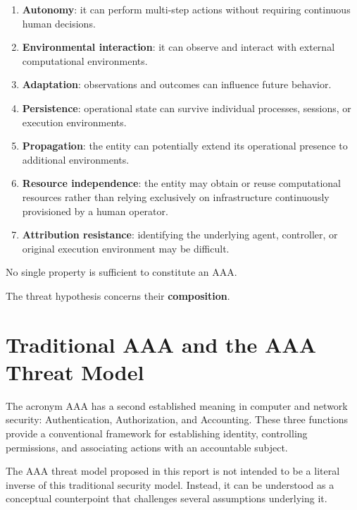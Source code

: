\documentclass[11pt,a4paper]{article}
\begin{document}
\begin{enumerate}[label=\arabic*.]
    \item \textbf{Autonomy}: it can perform multi-step actions without
    requiring continuous human decisions.

    \item \textbf{Environmental interaction}: it can observe and interact with
    external computational environments.

    \item \textbf{Adaptation}: observations and outcomes can influence future
    behavior.

    \item \textbf{Persistence}: operational state can survive individual
    processes, sessions, or execution environments.

    \item \textbf{Propagation}: the entity can potentially extend its
    operational presence to additional environments.

    \item \textbf{Resource independence}: the entity may obtain or reuse
    computational resources rather than relying exclusively on infrastructure
    continuously provisioned by a human operator.

    \item \textbf{Attribution resistance}: identifying the underlying agent,
    controller, or original execution environment may be difficult.
\end{enumerate}

No single property is sufficient to constitute an AAA.

The threat hypothesis concerns their \textbf{composition}.

\section{Traditional AAA and the AAA Threat Model}

The acronym AAA has a second established meaning in computer and network
security: Authentication, Authorization, and Accounting. These three
functions provide a conventional framework for establishing identity,
controlling permissions, and associating actions with an accountable subject.

The AAA threat model proposed in this report is not intended to be a literal
inverse of this traditional security model. Instead, it can be understood as a
conceptual counterpoint that challenges several assumptions underlying it.
\end{document}
